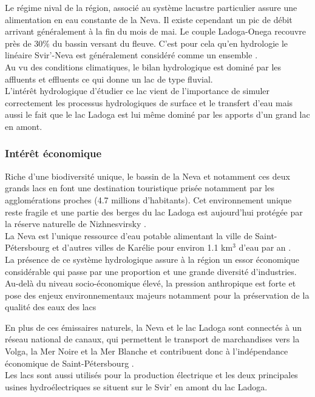 Le régime nival de la région, associé au système lacustre particulier assure une alimentation en eau constante de la Neva. Il existe cependant un pic de débit arrivant généralement à la fin du mois de mai. Le couple Ladoga-Onega recouvre près de 30\% du bassin versant du fleuve. C'est pour cela qu'en hydrologie le linéaire Svir'-Neva est généralement considéré comme un ensemble \citep{malmqvist2009}.\\
Au vu des conditions climatiques, le bilan hydrologique est dominé par les affluents et effluents ce qui donne un lac de type fluvial.\\
L'intérêt hydrologique d'étudier ce lac vient de l'importance de simuler correctement les processus hydrologiques de surface et le transfert d'eau mais aussi le fait que le lac Ladoga est lui même dominé par les apports d'un grand lac en amont.

\subsubsection*{{\selectfont Intérêt économique}}
Riche d'une biodiversité unique, le bassin de la Neva et notamment ces deux grands lacs en font une destination touristique prisée notamment par les agglomérations proches (4.7 millions d'habitants). Cet environnement unique reste fragile et une partie des berges du lac Ladoga est aujourd'hui protégée par la réserve naturelle de Nizhnesvirsky \citep{malmqvist2009}.\\
La Neva est l'unique ressource d'eau potable alimentant la ville de Saint-Pétersbourg et d'autres villes de Karélie pour environ 1.1 km$^{3}$ d'eau par an \citep{rukhovets2010}.\\

La présence de ce système hydrologique assure à la région un essor économique considérable qui passe par une proportion et une grande diversité d'industries. Au-delà du niveau socio-économique élevé, la pression anthropique est forte et pose des enjeux environnementaux majeurs notamment pour la préservation de la qualité des eaux des lacs \citep{rukhovets2010}

En plus de ces émissaires naturels, la Neva et le lac Ladoga sont connectés à un réseau national de canaux, qui permettent le transport de marchandises vers la Volga, la Mer Noire et la Mer Blanche et contribuent donc à l'indépendance économique de Saint-Pétersbourg \citep{malmqvist2009}. \\
Les lacs sont aussi utilisés pour la production électrique et les deux principales usines hydroélectriques se situent sur le Svir' en amont du lac Ladoga.

